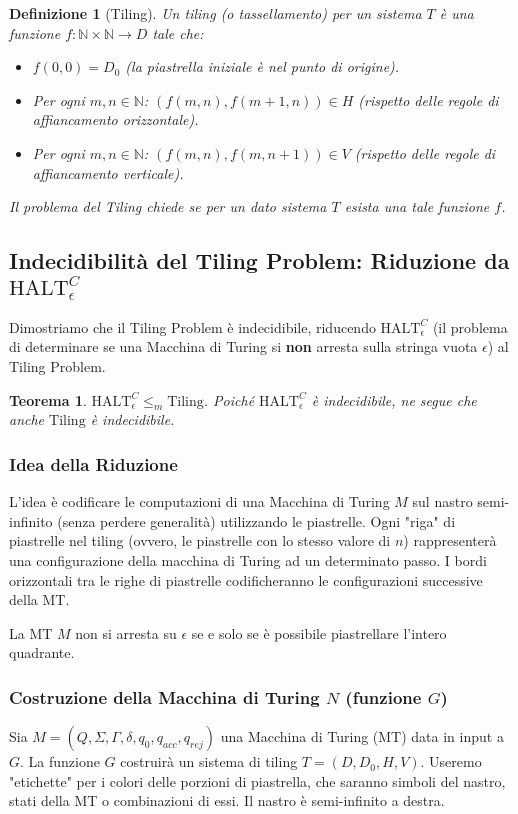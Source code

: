 \documentclass[a4paper]{article}
\newtheorem{theorem}{Teorema}
\newtheorem{definition}{Definizione}
\begin{document}
\begin{definition}[Tiling]
Un \emph{tiling} (o tassellamento) per un sistema $T$ è una funzione $f: \mathbb{N} \times \mathbb{N} \to D$ tale che:
\begin{itemize}
    \item $f(0,0) = D_0$ (la piastrella iniziale è nel punto di origine).
    \item Per ogni $m, n \in \mathbb{N}$: $(f(m,n), f(m+1,n)) \in H$ (rispetto delle regole di affiancamento orizzontale).
    \item Per ogni $m, n \in \mathbb{N}$: $(f(m,n), f(m,n+1)) \in V$ (rispetto delle regole di affiancamento verticale).
\end{itemize}
Il problema del Tiling chiede se per un dato sistema $T$ esista una tale funzione $f$.
\end{definition}

\subsection{Indecidibilit\`a del Tiling Problem: Riduzione da $\text{HALT}_\epsilon^C$}
Dimostriamo che il Tiling Problem è indecidibile, riducendo $\text{HALT}_\epsilon^C$ (il problema di determinare se una Macchina di Turing si \textbf{non} arresta sulla stringa vuota $\epsilon$) al Tiling Problem.

\begin{theorem}
$\text{HALT}_\epsilon^C \le_m \text{Tiling}$. Poiché $\text{HALT}_\epsilon^C$ è indecidibile, ne segue che anche $\text{Tiling}$ è indecidibile.
\end{theorem}

\subsubsection{Idea della Riduzione}
L'idea è codificare le computazioni di una Macchina di Turing $M$ sul nastro semi-infinito (senza perdere generalità) utilizzando le piastrelle. Ogni "riga" di piastrelle nel tiling (ovvero, le piastrelle con lo stesso valore di $n$) rappresenterà una configurazione della macchina di Turing ad un determinato passo. I bordi orizzontali tra le righe di piastrelle codificheranno le configurazioni successive della MT.

La MT $M$ non si arresta su $\epsilon$ se e solo se è possibile piastrellare l'intero quadrante.

\subsubsection{Costruzione della Macchina di Turing $N$ (funzione $G$)}
Sia $M = (Q, \Sigma, \Gamma, \delta, q_0, q_{acc}, q_{rej})$ una Macchina di Turing (MT) data in input a $G$. La funzione $G$ costruirà un sistema di tiling $T=(D, D_0, H, V)$.
Useremo "etichette" per i colori delle porzioni di piastrella, che saranno simboli del nastro, stati della MT o combinazioni di essi. Il nastro è semi-infinito a destra.
\end{document}
